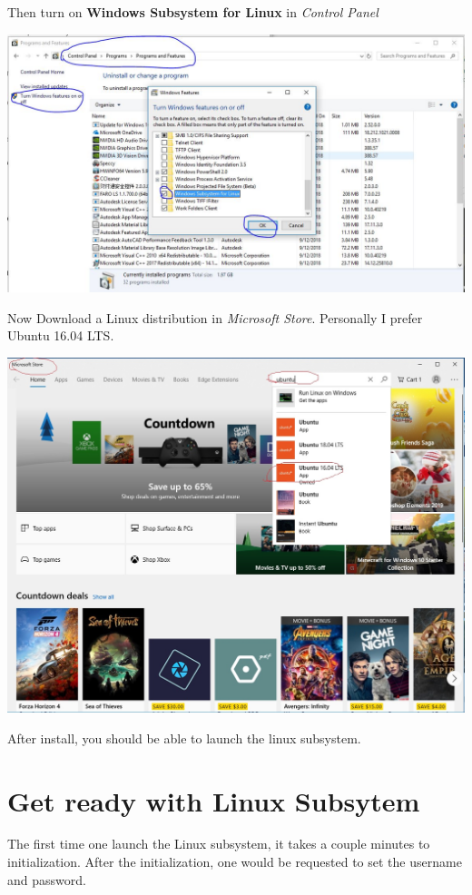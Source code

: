 \documentclass[11pt]{article}
\begin{document}
Then turn on \textbf{Windows Subsystem for Linux} in \emph{Control Panel}

\begin{center}
\includegraphics[width=.9\linewidth]{./funwave_img/2.JPG}
\end{center}

Now Download a Linux distribution in \emph{Microsoft Store}. Personally I prefer Ubuntu 16.04 LTS.

\begin{center}
\includegraphics[width=.9\linewidth]{./funwave_img/3.jpg}
\end{center}

After install, you should be able to launch the linux subsystem.

\section{Get ready with Linux Subsytem}
\label{sec:org426a71d}

The first time one launch the Linux subsystem, it takes a couple minutes to
initialization. After the initialization, one would be requested to set the
username and password. 
\end{document}
